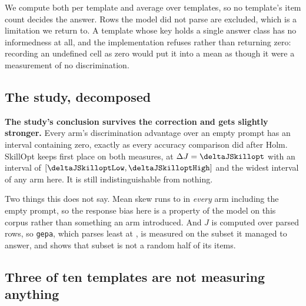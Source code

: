 We compute both per template and average over templates, so no template's item
count decides the answer. Rows the model did not parse are excluded, which is a
limitation we return to. A template whose key holds a single answer class has no
informedness at all, and the implementation refuses rather than returning zero:
recording an undefined cell as zero would put it into a mean as though it were a
measurement of no discrimination.

\subsection{The study, decomposed}

\begin{table}[htbp]
\centering
\signalTable
\caption{Discrimination by arm, with cluster-bootstrap intervals resampling
templates. Parse rate is the share of readings that produced a readable answer;
everything else is computed over that subset.}
\label{tab:signal}
\end{table}


\textbf{The study's conclusion survives the correction and gets slightly
stronger.} Every arm's discrimination advantage over an empty prompt has an
interval containing zero, exactly as every accuracy comparison did after Holm.
SkillOpt keeps first place on both measures, at
$\Delta J = \NUM{\deltaJSkillopt}$ with an interval of
$[\NUM{\deltaJSkilloptLow}, \NUM{\deltaJSkilloptHigh}]$ and the widest interval
of any arm here. It is still indistinguishable from nothing.

Two things this does not say. Mean skew runs \NUM{\meanSkewGepa} to
\NUM{\meanSkewOn} in \emph{every} arm including the empty prompt, so the
response bias here is a property of the model on this corpus rather than
something an arm introduced. And $J$ is computed over parsed rows, so
\texttt{gepa}, which parses least at \NUM{\parseRateGepa}, is measured on the
subset it managed to answer, and  shows that subset is not a
random half of its items.

\subsection{Three of ten templates are not measuring anything}

